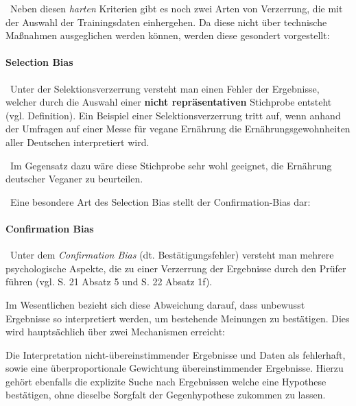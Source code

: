 ~\newline Neben diesen \textit{harten} Kriterien gibt es noch zwei Arten von Verzerrung, die mit der Auswahl der Trainingsdaten einhergehen. Da diese nicht über technische Maßnahmen ausgeglichen werden können, werden diese gesondert vorgestellt:
\paragraph{Selection Bias} ~\newline  Unter der Selektionsverzerrung versteht man einen Fehler der Ergebnisse, welcher durch die Auswahl einer \textbf{nicht repräsentativen} Stichprobe entsteht (vgl. \cite{SelectionBias} Definition). Ein Beispiel einer Selektionsverzerrung tritt auf, wenn anhand der Umfragen auf einer Messe für vegane Ernährung die Ernährungsgewohnheiten aller Deutschen interpretiert wird. 

~\newline  Im Gegensatz dazu wäre diese Stichprobe sehr wohl geeignet, die Ernährung deutscher Veganer zu beurteilen.  

~\newline Eine besondere Art des Selection Bias stellt der Confirmation-Bias dar:
\paragraph{Confirmation Bias} ~\newline  Unter dem \textit{Confirmation Bias} (dt. Bestätigungsfehler) versteht man mehrere psychologische Aspekte, die zu einer Verzerrung der Ergebnisse durch den Prüfer führen (vgl. \cite{ConfirmationBias} S. 21 Absatz 5 und S. 22 Absatz 1f). 

Im Wesentlichen bezieht sich diese Abweichung darauf, dass unbewusst Ergebnisse so interpretiert werden, um bestehende Meinungen zu bestätigen. Dies wird hauptsächlich über zwei Mechanismen erreicht: 

Die Interpretation nicht-übereinstimmender Ergebnisse und Daten als fehlerhaft, sowie eine überproportionale Gewichtung übereinstimmender Ergebnisse. Hierzu gehört ebenfalls die explizite Suche nach Ergebnissen welche eine Hypothese bestätigen, ohne dieselbe Sorgfalt der Gegenhypothese zukommen zu lassen. 
